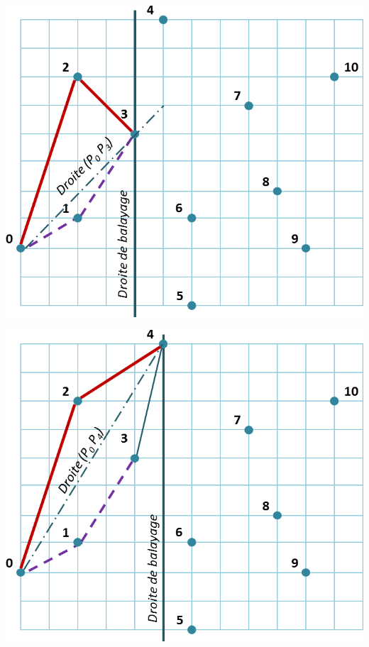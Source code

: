 \documentclass[10pt,fleqn]{article} %
\begin{document}
\begin{minipage}[c]{.22\linewidth}
\begin{center}
\includegraphics[width=.95\textwidth]{images/orientation_1}
\end{center}
\end{minipage} \hfill
\begin{minipage}[c]{.22\linewidth}
\begin{center}
\includegraphics[width=.95\textwidth]{images/orientation_2}
\end{center}
\end{minipage} \hfill
\end{document}

